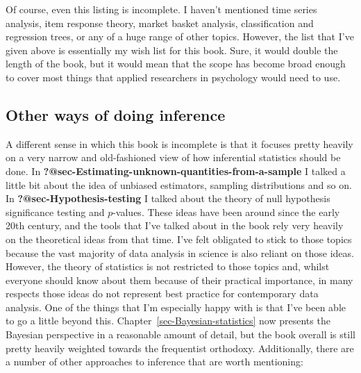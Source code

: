 \documentclass[
  a4paper,
]{book}
\begin{document}
Of course, even this listing is incomplete. I haven't mentioned time
series analysis, item response theory, market basket analysis,
classification and regression trees, or any of a huge range of other
topics. However, the list that I've given above is essentially my wish
list for this book. Sure, it would double the length of the book, but it
would mean that the scope has become broad enough to cover most things
that applied researchers in psychology would need to use.

\hypertarget{other-ways-of-doing-inference}{%
\subsection*{Other ways of doing
inference}\label{other-ways-of-doing-inference}}

A different sense in which this book is incomplete is that it focuses
pretty heavily on a very narrow and old-fashioned view of how
inferential statistics should be done. In
\textbf{?@sec-Estimating-unknown-quantities-from-a-sample} I talked a
little bit about the idea of unbiased estimators, sampling distributions
and so on. In \textbf{?@sec-Hypothesis-testing} I talked about the
theory of null hypothesis significance testing and \(p\)-values. These
ideas have been around since the early 20th century, and the tools that
I've talked about in the book rely very heavily on the theoretical ideas
from that time. I've felt obligated to stick to those topics because the
vast majority of data analysis in science is also reliant on those
ideas. However, the theory of statistics is not restricted to those
topics and, whilst everyone should know about them because of their
practical importance, in many respects those ideas do not represent best
practice for contemporary data analysis. One of the things that I'm
especially happy with is that I've been able to go a little beyond this.
Chapter~\ref{sec-Bayesian-statistics} now presents the Bayesian
perspective in a reasonable amount of detail, but the book overall is
still pretty heavily weighted towards the frequentist orthodoxy.
Additionally, there are a number of other approaches to inference that
are worth mentioning:
\end{document}
